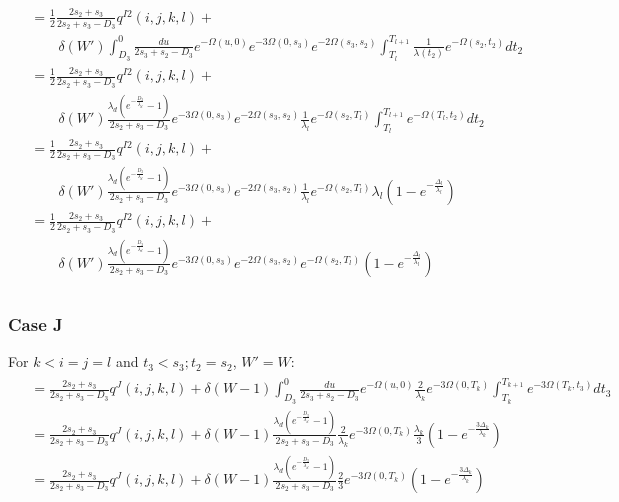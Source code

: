 \documentclass{article}
\begin{document}
\begin{align}
    \begin{split}
        &= \frac{1}{2}\frac{2s_2+s_3}{2s_2+s_3-D_3}q^{I2}(i,j,k,l)+\\
        &\qquad \delta(W')
        \int_{D_3}^{0}\frac{du}{2s_3+s_2-D_3}e^{-\Omega(u,0)}e^{-3\Omega(0,s_3)}e^{-2\Omega(s_3,s_2)}\int_{T_l}^{T_{l+1}}\frac{1}{\lambda(t_2)}e^{-\Omega(s_2,t_2)}dt_2\\
        &= \frac{1}{2}\frac{2s_2+s_3}{2s_2+s_3-D_3}q^{I2}(i,j,k,l)+\\
        &\qquad \delta(W')
        \frac{\lambda_d\left(e^{-\frac{D_3}{\lambda_d}}-1\right)}{2s_2+s_3-D_3}e^{-3\Omega(0,s_3)}e^{-2\Omega(s_3,s_2)}\frac{1}{\lambda_l}e^{-\Omega(s_2,T_l)}\int_{T_l}^{T_{l+1}}e^{-\Omega(T_l,t_2)}dt_2\\
        &= \frac{1}{2}\frac{2s_2+s_3}{2s_2+s_3-D_3}q^{I2}(i,j,k,l)+\\
        &\qquad \delta(W')
        \frac{\lambda_d\left(e^{-\frac{D_3}{\lambda_d}}-1\right)}{2s_2+s_3-D_3}e^{-3\Omega(0,s_3)}e^{-2\Omega(s_3,s_2)}\frac{1}{\lambda_l}e^{-\Omega(s_2,T_l)}\lambda_l\left(1-e^{-\frac{\Delta_l}{\lambda_l}}\right)\\
        &= \frac{1}{2}\frac{2s_2+s_3}{2s_2+s_3-D_3}q^{I2}(i,j,k,l)+\\
        &\qquad \delta(W')
        \frac{\lambda_d\left(e^{-\frac{D_3}{\lambda_d}}-1\right)}{2s_2+s_3-D_3}e^{-3\Omega(0,s_3)}e^{-2\Omega(s_3,s_2)}e^{-\Omega(s_2,T_l)}\left(1-e^{-\frac{\Delta_l}{\lambda_l}}\right)\\
    \end{split}
\end{align}

\subsubsection{Case J}
For $k<i=j=l$ and $t_3<s_3;t_2=s_2$, $W' = W$:
\begin{align}
    \begin{split}
        &=\frac{2s_2+s_3}{2s_2+s_3-D_3}q^{J}(i,j,k,l)+
        \delta(W-1)
        \int_{D_3}^{0}\frac{du}{2s_3+s_2-D_3}e^{-\Omega(u,0)}\frac{2}{\lambda_k}e^{-3\Omega(0,T_k)}\int_{T_k}^{T_{k+1}}e^{-3\Omega(T_k,t_3)}dt_3\\
        &=\frac{2s_2+s_3}{2s_2+s_3-D_3}q^{J}(i,j,k,l)+
        \delta(W-1)
        \frac{\lambda_d\left(e^{-\frac{D_3}{\lambda_d}}-1\right)}{2s_2+s_3-D_3}\frac{2}{\lambda_k}e^{-3\Omega(0,T_k)}\frac{\lambda_k}{3}\left(1-e^{-\frac{3\Delta_k}{\lambda_k}}\right)\\
        &=\frac{2s_2+s_3}{2s_2+s_3-D_3}q^{J}(i,j,k,l)+
        \delta(W-1)
        \frac{\lambda_d\left(e^{-\frac{D_3}{\lambda_d}}-1\right)}{2s_2+s_3-D_3}\frac{2}{3}e^{-3\Omega(0,T_k)}\left(1-e^{-\frac{3\Delta_k}{\lambda_k}}\right)\\
    \end{split}
\end{align}
\end{document}
